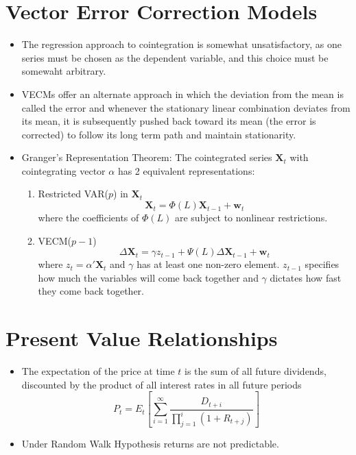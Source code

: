 \documentclass[11pt]{article}
\begin{document}
\section{Vector Error Correction Models}
\begin{itemize}
    \item The regression approach to cointegration is somewhat unsatisfactory, as one series 
    must be chosen as the dependent variable, and this choice must be somewaht arbitrary. 
    \item VECMs offer an alternate approach in which the deviation from the mean is called the 
    error and whenever the stationary linear combination deviates from its mean, it is 
    subsequently pushed back toward its mean (the error is corrected) to follow its long term 
    path and maintain stationarity. 
    \item Granger's Representation Theorem: The cointegrated series $\boldsymbol{X}_t$ with 
    cointegrating vector $\alpha$ has 2 equivalent representations: 
    \begin{enumerate}
        \item Restricted VAR($p$) in $\boldsymbol{X}_t$ 
        \[ \boldsymbol{X}_t = \Phi(L)\boldsymbol{X}_{t-1} + \boldsymbol{w}_t \]
        where the coefficients of $\Phi(L)$ are subject to nonlinear restrictions. 
        \item VECM($p-1$) 
        \[ 
        \Delta\boldsymbol{X}_t = \gamma z_{t-1} + \Psi(L) \Delta \boldsymbol{X}_{t-1} + 
        \boldsymbol{w}_t 
        \]
        where $z_t = \alpha' \boldsymbol{X}_t$ and $\gamma$ has at least one non-zero element. 
        $z_{t-1}$ specifies how much the variables will come back together and $\gamma$ 
        dictates how fast they come back together. 
    \end{enumerate}
\end{itemize}

\section{Present Value Relationships}

\begin{itemize}
    \item The expectation of the price at time $t$ is the sum of all future dividends,
    discounted by the product of all interest rates in all future periods
    \[
    P_t = E_t \left[ \sum_{i=1}^{\infty} \frac{D_{t+i}}{\prod_{j=1}^{i} (1 + R_{t+j})}\right]
    \]
    \item Under Random Walk Hypothesis returns are not predictable. 
\end{itemize}
\end{document}
